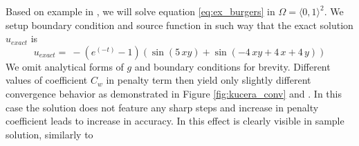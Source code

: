 \begin{example}
\label{ex:kucera}
Based on example in \cite[Section 1.6]{Kucera},
we will solve equation \eqref{eq:ex_burgers} in $\Omega = \langle 0, 1 \rangle^2$.
We setup boundary condition and source function in such way that the exact 
solution $u_{exact}$ is
\begin{equation}
	u_{exact} =  \ -{\left(e^{\left(-t\right)} - 1\right)} {\left(\sin\left(5 \,x 
	y\right) + \sin\left(-4 \, 
	x y + 4 \,x + 4 \, y\right)\right)}
\end{equation}
We omit analytical forms of $g$ and boundary conditions for brevity.
Different values of coefficient $C_w$ in penalty term then yield only slightly different 
convergence behavior as demonstrated in Figure \ref{fig:kucera_conv} and 
. In this case the solution does not feature any sharp steps and 
increase in penalty coefficient leads to increase in accuracy. In  
this effect is clearly visible in sample solution, similarly to 
\end{example}

